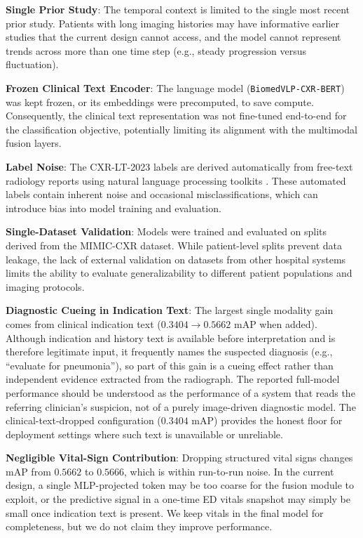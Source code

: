 \textbf{Single Prior Study}: The temporal context is limited to the single most recent prior study. Patients with long imaging histories may have informative earlier studies that the current design cannot access, and the model cannot represent trends across more than one time step (e.g., steady progression versus fluctuation).

\textbf{Frozen Clinical Text Encoder}: The language model (\texttt{BiomedVLP-CXR-BERT}) was kept frozen, or its embeddings were precomputed, to save compute. Consequently, the clinical text representation was not fine-tuned end-to-end for the classification objective, potentially limiting its alignment with the multimodal fusion layers.

\textbf{Label Noise}: The CXR-LT-2023 labels are derived automatically from free-text radiology reports using natural language processing toolkits \cite{holste2024cxrlt}. These automated labels contain inherent noise and occasional misclassifications, which can introduce bias into model training and evaluation.

\textbf{Single-Dataset Validation}: Models were trained and evaluated on splits derived from the MIMIC-CXR dataset. While patient-level splits prevent data leakage, the lack of external validation on datasets from other hospital systems limits the ability to evaluate generalizability to different patient populations and imaging protocols.

\textbf{Diagnostic Cueing in Indication Text}: The largest single modality gain comes from clinical indication text ($0.3404 \rightarrow 0.5662$ mAP when added). Although indication and history text is available before interpretation and is therefore legitimate input, it frequently names the suspected diagnosis (e.g., ``evaluate for pneumonia''), so part of this gain is a cueing effect rather than independent evidence extracted from the radiograph. The reported full-model performance should be understood as the performance of a system that reads the referring clinician's suspicion, not of a purely image-driven diagnostic model. The clinical-text-dropped configuration ($0.3404$ mAP) provides the honest floor for deployment settings where such text is unavailable or unreliable.

\textbf{Negligible Vital-Sign Contribution}: Dropping structured vital signs changes mAP from $0.5662$ to $0.5666$, which is within run-to-run noise. In the current design, a single MLP-projected token may be too coarse for the fusion module to exploit, or the predictive signal in a one-time ED vitals snapshot may simply be small once indication text is present. We keep vitals in the final model for completeness, but we do not claim they improve performance.

